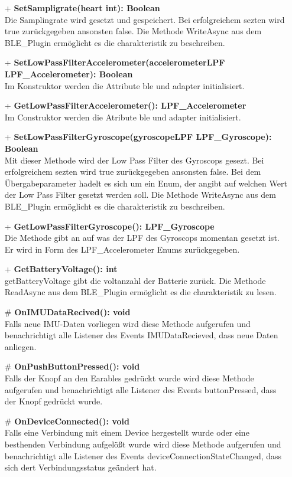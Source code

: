 \documentclass[a4paper,12pt]{article}
\begin{document}
\begin{itemize}
	\item[+] \textbf{SetSampligrate(heart int): Boolean}\\Die Samplingrate wird gesetzt und gespeichert. Bei erfolgreichem sezten wird true zurückgegeben ansonsten false. Die Methode WriteAsync aus dem BLE\_Plugin ermöglicht es die charakteristik zu beschreiben.
	\item[+] \textbf{SetLowPassFilterAccelerometer(accelerometerLPF LPF\_Accelerometer): Boolean}\\ Im Konstruktor werden die Attribute ble und adapter initialisiert.
	\item[+] \textbf{GetLowPassFilterAccelerometer(): LPF\_Accelerometer}\\ Im Construktor werden die Atribute ble und adapter initialisiert.
	\item[+] \textbf{SetLowPassFilterGyroscope(gyroscopeLPF LPF\_Gyroscope): Boolean}\\ Mit dieser Methode wird der Low Pass Filter des Gyroscops gesezt. Bei erfolgreichem sezten wird true zurückgegeben ansonsten false. Bei dem Übergabeparameter hadelt es sich um ein Enum, der angibt auf welchen Wert der Low Pass Filter gesetzt werden soll. Die Methode WriteAsync aus dem BLE\_Plugin ermöglicht es die charakteristik zu beschreiben.
	\item[+] \textbf{GetLowPassFilterGyroscope(): LPF\_Gyroscope}\\Die Methode gibt an auf was der LPF des Gyroscops momentan gesetzt ist. Er wird in Form des LPF\_Accelerometer Enums zurückgegeben. 
	\item[+] \textbf{GetBatteryVoltage(): int}\\ getBatteryVoltage gibt die voltanzahl der Batterie zurück. Die Methode ReadAsync aus dem BLE\_Plugin ermöglicht es die charakteristik zu lesen.
	\item[\#] \textbf{OnIMUDataRecived(): void}\\Falls neue IMU-Daten vorliegen wird diese Methode aufgerufen und benachrichtigt alle Listener des Events IMUDataRecieved, dass neue Daten anliegen.
	\item[\#] \textbf{OnPushButtonPressed(): void}\\ Falls der Knopf an den Earables gedrückt wurde wird diese Methode aufgerufen und benachrichtigt alle Listener des Events buttonPressed, dass der Knopf gedrückt wurde.
	\item[\#] \textbf{OnDeviceConnected(): void}\\ Falls eine Verbindung mit einem Device hergestellt wurde oder eine besthenden Verbindung aufgelößt wurde wird diese Methode aufgerufen und benachrichtigt alle Listener des Events deviceConnectionStateChanged, dass sich dert Verbindungsstatus geändert hat.
\end{itemize}
\end{document}
